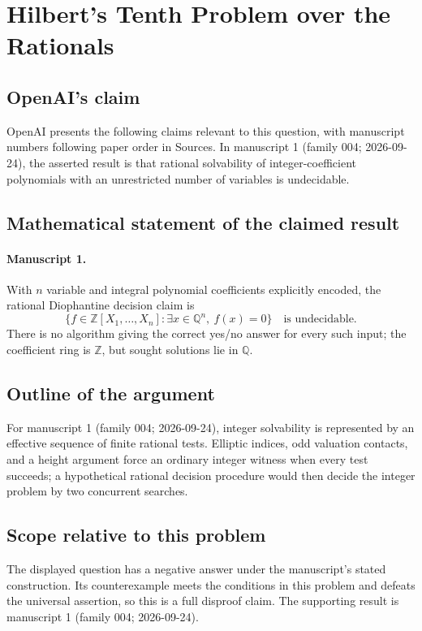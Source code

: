 \documentclass[11pt]{article}
\begin{document}
\section*{Hilbert's Tenth Problem over the Rationals}

\subsection{OpenAI's claim}
OpenAI presents the following claims relevant to this question, with manuscript numbers following paper order in Sources. In manuscript 1 (family 004; 2026-09-24), the asserted result is that rational solvability of integer-coefficient polynomials with an unrestricted number of variables is undecidable.

\subsection{Mathematical statement of the claimed result}
\paragraph{Manuscript 1.}
With $n$ variable and integral polynomial coefficients explicitly encoded, the rational Diophantine decision claim is
\[
 \{f\in\mathbb Z[X_1,\ldots,X_n]:\exists x\in\mathbb Q^n,\ f(x)=0\}
 \quad\text{is undecidable}.
\]
There is no algorithm giving the correct yes/no answer for every such input; the coefficient ring is $\mathbb Z$, but sought solutions lie in $\mathbb Q$.

\subsection{Outline of the argument}
For manuscript 1 (family 004; 2026-09-24), integer solvability is represented by an effective sequence of finite rational tests. Elliptic indices, odd valuation contacts, and a height argument force an ordinary integer witness when every test succeeds; a hypothetical rational decision procedure would then decide the integer problem by two concurrent searches.

\subsection{Scope relative to this problem}
The displayed question has a negative answer under the manuscript's stated construction. Its counterexample meets the conditions in this problem and defeats the universal assertion, so this is a full disproof claim. The supporting result is manuscript 1 (family 004; 2026-09-24).
\end{document}
